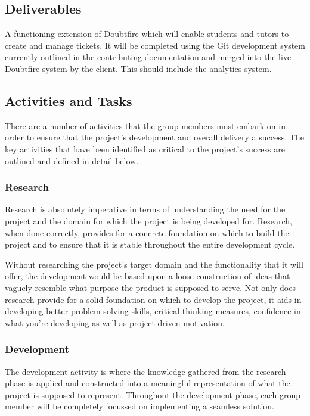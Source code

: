 \documentclass[12pt,a4paper,]{article}
\begin{document}
\subsection{Deliverables}\label{deliverables}

A functioning extension of Doubtfire which will enable students and
tutors to create and manage tickets. It will be completed using the Git
development system currently outlined in the contributing documentation
and merged into the live Doubtfire system by the client. This should
include the analytics system.

\subsection{Activities and Tasks}\label{activities-and-tasks}

There are a number of activities that the group members must embark on
in order to ensure that the project's development and overall delivery a
success. The key activities that have been identified as critical to the
project's success are outlined and defined in detail below.

\subsubsection{Research}\label{research}

Research is absolutely imperative in terms of understanding the need for
the project and the domain for which the project is being developed for.
Research, when done correctly, provides for a concrete foundation on
which to build the project and to ensure that it is stable throughout
the entire development cycle.

Without researching the project's target domain and the functionality
that it will offer, the development would be based upon a loose
construction of ideas that vaguely resemble what purpose the product is
supposed to serve. Not only does research provide for a solid foundation
on which to develop the project, it aids in developing better problem
solving skills, critical thinking measures, confidence in what you're
developing as well as project driven motivation.

\subsubsection{Development}\label{development}

The development activity is where the knowledge gathered from the
research phase is applied and constructed into a meaningful
representation of what the project is supposed to represent. Throughout
the development phase, each group member will be completely focussed on
implementing a seamless solution.
\end{document}
